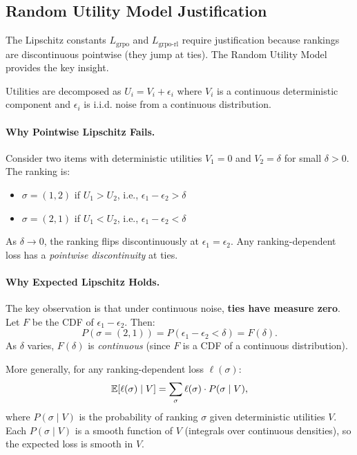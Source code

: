 \subsection{Random Utility Model Justification}

The Lipschitz constants $L_{\text{grpo}}$ and $L_{\text{grpo-rl}}$ require justification because rankings are discontinuous pointwise (they jump at ties). The Random Utility Model provides the key insight.

\begin{assumption}
Utilities are decomposed as $U_i = V_i + \epsilon_i$ where $V_i$ is a continuous deterministic component and $\epsilon_i$ is i.i.d. noise from a continuous distribution.
\end{assumption}

\paragraph{Why Pointwise Lipschitz Fails.}
Consider two items with deterministic utilities $V_1 = 0$ and $V_2 = \delta$ for small $\delta > 0$. The ranking is:
\begin{itemize}
    \item $\sigma = (1, 2)$ if $U_1 > U_2$, i.e., $\epsilon_1 - \epsilon_2 > \delta$
    \item $\sigma = (2, 1)$ if $U_1 < U_2$, i.e., $\epsilon_1 - \epsilon_2 < \delta$
\end{itemize}
As $\delta \to 0$, the ranking flips discontinuously at $\epsilon_1 = \epsilon_2$. Any ranking-dependent loss has a \emph{pointwise discontinuity} at ties.

\paragraph{Why Expected Lipschitz Holds.}
The key observation is that under continuous noise, \textbf{ties have measure zero}. Let $F$ be the CDF of $\epsilon_1 - \epsilon_2$. Then:
\[
P(\sigma = (2, 1)) = P(\epsilon_1 - \epsilon_2 < \delta) = F(\delta).
\]
As $\delta$ varies, $F(\delta)$ is \emph{continuous} (since $F$ is a CDF of a continuous distribution).

More generally, for any ranking-dependent loss $\ell(\sigma)$:
\[
\mathbb{E}[\ell(\sigma) \mid V] = \sum_{\sigma} \ell(\sigma) \cdot P(\sigma \mid V),
\]
where $P(\sigma \mid V)$ is the probability of ranking $\sigma$ given deterministic utilities $V$. Each $P(\sigma \mid V)$ is a smooth function of $V$ (integrals over continuous densities), so the expected loss is smooth in $V$.

